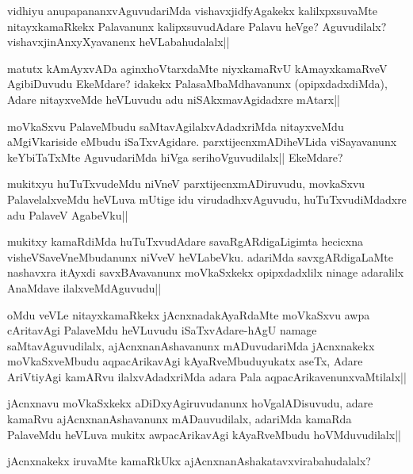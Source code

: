 \begin{artha}
vidhiyu anupapananxvAguvudariMda vishavxjidfyAgakekx kalilxpxsuvaMte nitayxkamaRkekx Palavanunx kalipxsuvudAdare Palavu heVge? Aguvudilalx? vishavxjinAnxyXyavanenx heVLabahudalalx||
\end{artha}

\begin{artha}
matutx kAmAyxvADa aginxhoVtarxdaMte niyxkamaRvU kAmayxkamaRveV AgibiDuvudu EkeMdare? idakekx PalasaMbaMdhavanunx (opipxdadxdiMda), Adare nitayxveMde heVLuvudu adu niSAkxmavAgidadxre mAtarx||
\end{artha}

\begin{artha}
moVkaSxvu PalaveMbudu saMtavAgilalxvAdadxriMda nitayxveMdu aMgiVkariside eMbudu iSaTxvAgidare. parxtijecnxmADiheVLida viSayavanunx keYbiTaTxMte AguvudariMda hiVga serihoVguvudilalx|| EkeMdare?
\end{artha}

\begin{artha}
mukitxyu huTuTxvudeMdu niVneV parxtijecnxmADiruvudu, movkaSxvu PalavelalxveMdu heVLuva mUtige idu virudadhxvAguvudu, huTuTxvudiMdadxre adu PalaveV AgabeVku||
\end{artha}

\begin{artha}
mukitxy kamaRdiMda huTuTxvudAdare savaRgARdigaLigimta hecicxna visheVSaveVneMbudanunx niVveV heVLabeVku. adariMda savxgARdigaLaMte nashavxra itAyxdi savxBAvavanunx moVkaSxkekx opipxdadxlilx ninage adaralilx AnaMdave ilalxveMdAguvudu||
\end{artha}

\begin{artha}
oMdu veVLe nitayxkamaRkekx jAcnxnadakAyaRdaMte moVkaSxvu awpa cAritavAgi PalaveMdu heVLuvudu iSaTxvAdare-hAgU namage saMtavAguvudilalx, ajAcnxnanAshavanunx mADuvudariMda jAcnxnakekx moVkaSxveMbudu aqpacArikavAgi kAyaRveMbuduyukatx aseTx, Adare AriVtiyAgi kamARvu ilalxvAdadxriMda adara Pala aqpacArikavenunxvaMtilalx||
\end{artha}

\begin{artha}
jAcnxnavu moVkaSxkekx aDiDxyAgiruvudanunx hoVgalADisuvudu, adare kamaRvu ajAcnxnanAshavanunx mADauvudilalx, adariMda kamaRda PalaveMdu heVLuva mukitx awpacArikavAgi kAyaRveMbudu hoVMduvudilalx||
\end{artha}

\begin{artha}
jAcnxnakekx iruvaMte kamaRkUkx ajAcnxnanAshakatavxvirabahudalalx?
\end{artha}


